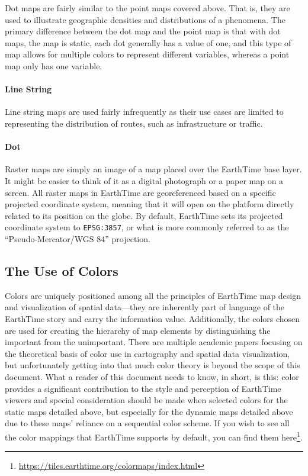 \documentclass[
  12pt,
]{krantz}
\renewcommand{\href}[2]{#2\footnote{\url{#1}}}
\begin{document}
Dot maps are fairly similar to the point maps covered above. That is, they are used to illustrate geographic densities and distributions of a phenomena. The primary difference between the dot map and the point map is that with dot maps, the map is static, each dot generally has a value of one, and this type of map allows for multiple colors to represent different variables, whereas a point map only has one variable.

\hypertarget{line-string}{%
\paragraph*{Line String}\label{line-string}}

Line string maps are used fairly infrequently as their use cases are limited to representing the distribution of routes, such as infrastructure or traffic.

\hypertarget{dot-1}{%
\paragraph*{Dot}\label{dot-1}}

Raster maps are simply an image of a map placed over the EarthTime base layer. It might be easier to think of it as a digital photograph or a paper map on a screen. All raster maps in EarthTime are georeferenced based on a specific projected coordinate system, meaning that it will open on the platform directly related to its position on the globe. By default, EarthTime sets its projected coordinate system to \texttt{EPSG:3857}, or what is more commonly referred to as the ``Pseudo-Mercator/WGS 84'' projection.

\hypertarget{the-use-of-colors}{%
\subsection{The Use of Colors}\label{the-use-of-colors}}

Colors are uniquely positioned among all the principles of EarthTime map design and visualization of spatial data---they are inherently part of language of the EarthTime story and carry the information value. Additionally, the colors chosen are used for creating the hierarchy of map elements by distinguishing the important from the unimportant. There are multiple academic papers focusing on the theoretical basis of color use in cartography and spatial data visualization, but unfortunately getting into that much color theory is beyond the scope of this document. What a reader of this document needs to know, in short, is this: color provides a significant contribution to the style and perception of EarthTime viewers and special consideration should be made when selected colors for the static maps detailed above, but especially for the dynamic maps detailed above due to these maps' reliance on a sequential color scheme. If you wish to see all the color mappings that EarthTime supports by default, you can find them \href{https://tiles.earthtime.org/colormaps/index.html}{here}.
\end{document}

